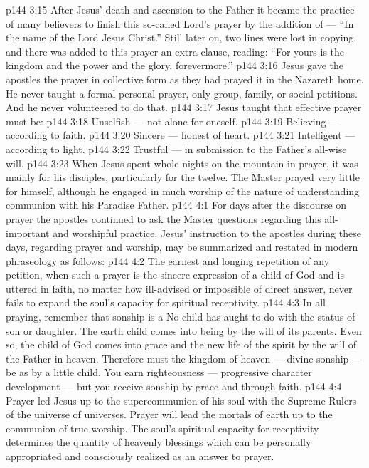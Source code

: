 \vs p144 3:15 After Jesus’ death and ascension to the Father it became the practice of many believers to finish this so\hyp{}called Lord’s prayer by the addition of --- “In the name of the Lord Jesus Christ.” Still later on, two lines were lost in copying, and there was added to this prayer an extra clause, reading: “For yours is the kingdom and the power and the glory, forevermore.”
\vs p144 3:16 Jesus gave the apostles the prayer in collective form as they had prayed it in the Nazareth home. He never taught a formal personal prayer, only group, family, or social petitions. And he never volunteered to do that.
\vs p144 3:17 Jesus taught that effective prayer must be:
\vs p144 3:18 \bibnobreakspace Unselfish --- not alone for oneself.
\vs p144 3:19 \bibnobreakspace Believing --- according to faith.
\vs p144 3:20 \bibnobreakspace Sincere --- honest of heart.
\vs p144 3:21 \bibnobreakspace Intelligent --- according to light.
\vs p144 3:22 \bibnobreakspace Trustful --- in submission to the Father’s all\hyp{}wise will.
\vs p144 3:23 \pc When Jesus spent whole nights on the mountain in prayer, it was mainly for his disciples, particularly for the twelve. The Master prayed very little for himself, although he engaged in much worship of the nature of understanding communion with his Paradise Father.
\vs p144 4:1 For days after the discourse on prayer the apostles continued to ask the Master questions regarding this all\hyp{}important and worshipful practice. Jesus’ instruction to the apostles during these days, regarding prayer and worship, may be summarized and restated in modern phraseology as follows:
\vs p144 4:2 \pc The earnest and longing repetition of any petition, when such a prayer is the sincere expression of a child of God and is uttered in faith, no matter how ill\hyp{}advised or impossible of direct answer, never fails to expand the soul’s capacity for spiritual receptivity.
\vs p144 4:3 In all praying, remember that sonship is a  No child has aught to do with  the status of son or daughter. The earth child comes into being by the will of its parents. Even so, the child of God comes into grace and the new life of the spirit by the will of the Father in heaven. Therefore must the kingdom of heaven --- divine sonship --- be  as by a little child. You earn righteousness --- progressive character development --- but you receive sonship by grace and through faith.
\vs p144 4:4 Prayer led Jesus up to the supercommunion of his soul with the Supreme Rulers of the universe of universes. Prayer will lead the mortals of earth up to the communion of true worship. The soul’s spiritual capacity for receptivity determines the quantity of heavenly blessings which can be personally appropriated and consciously realized as an answer to prayer.
